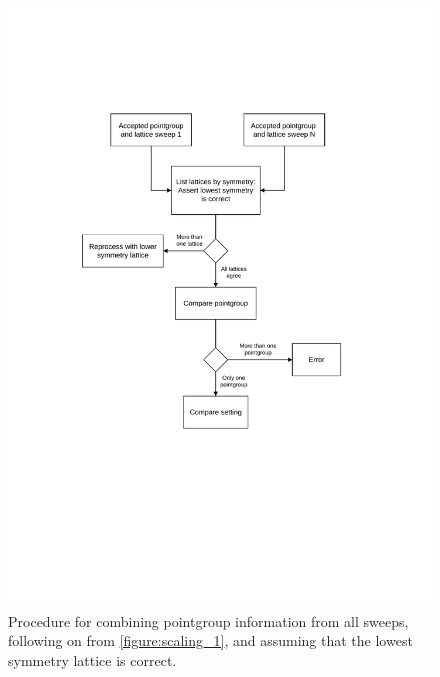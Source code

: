 \documentclass[preprint,pdf]{iucr}
\begin{document}
\begin{figure}
\caption{Procedure for combining pointgroup information from all
  sweeps, following on from \ref{figure:scaling_1}, and assuming that
  the lowest symmetry lattice is correct.
\label{figure:scaling_2}}
\centering
\includegraphics[scale=0.5]{figures/scaling-step-2.pdf}
\end{figure}
\end{document}

